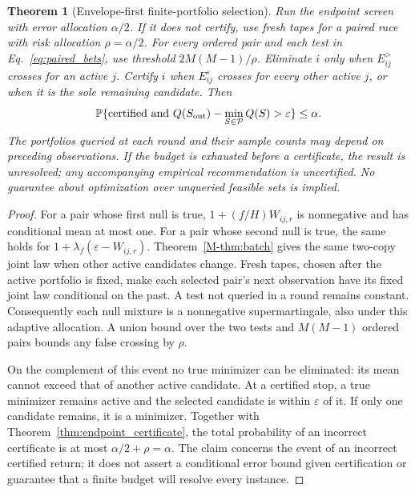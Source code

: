 \documentclass[preprint,11pt,sort&compress]{elsarticle}
\newtheorem{theorem}{Theorem}
\newcommand{\Prob}{\mathbb{P}}
\begin{document}
\begin{theorem}[Envelope-first finite-portfolio selection]
\label{thm:envelope_selection}
Run the endpoint screen with error allocation $\alpha/2$. If it does not
certify, use fresh tapes for a paired race with risk allocation
$\rho=\alpha/2$. For every ordered pair and each test in
Eq.~\ref{eq:paired_bets}, use threshold $2M(M-1)/\rho$. Eliminate $i$ only
when $E^{>}_{ij}$ crosses for an active $j$. Certify $i$ when
$E^{\varepsilon}_{ij}$ crosses for every other active $j$, or when it is
the sole remaining candidate. Then
\begin{equation}
 \Prob\{\text{certified and }Q(S_{\rm out})-
          \min_{S\in\mathcal P}Q(S)>\varepsilon\}\le\alpha.
 \label{eq:portfolio_pac}
\end{equation}
The portfolios queried at each round and their sample counts may depend
on preceding observations. If the budget is exhausted before a certificate,
the result is unresolved; any accompanying empirical recommendation is
uncertified. No guarantee about optimization over unqueried feasible sets
is implied.
\end{theorem}
\begin{proof}
For a pair whose first null is true, $1+(f/H)W_{ij,r}$ is nonnegative
and has conditional mean at most one. For a pair whose second null is
true, the same holds for $1+\lambda_f(\varepsilon-W_{ij,r})$.
Theorem~\ref{M-thm:batch} gives the same two-copy joint law when other active
candidates change. Fresh tapes, chosen after the active portfolio is fixed,
make each selected pair's next observation have its fixed joint law
conditional on the past. A test not queried in a round remains constant.
Consequently each null mixture is a nonnegative supermartingale, also
under this adaptive allocation. A union bound over the two tests and
$M(M-1)$ ordered pairs bounds any false crossing by $\rho$.

On the complement of this event no true minimizer can be eliminated:
its mean cannot exceed that of another active candidate. At a certified
stop, a true minimizer remains active and the selected candidate is within
$\varepsilon$ of it. If only one candidate remains, it is a minimizer.
Together with Theorem~\ref{thm:endpoint_certificate}, the total probability
of an incorrect certificate is at most $\alpha/2+\rho=\alpha$.
The claim concerns the event of an incorrect certified return; it does not
assert a conditional error bound given certification or guarantee that a
finite budget will resolve every instance.
\end{proof}
\end{document}
